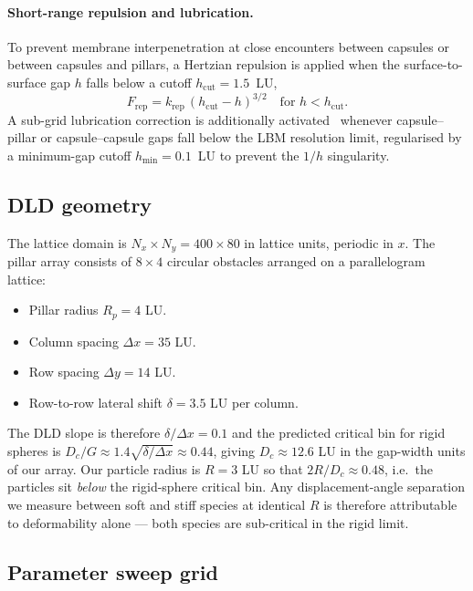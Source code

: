 \documentclass[11pt,a4paper]{article}
\begin{document}
\paragraph{Short-range repulsion and lubrication.}
To prevent membrane interpenetration at close encounters between
capsules or between capsules and pillars, a Hertzian repulsion is
applied when the surface-to-surface gap $h$ falls below a cutoff
$h_{\text{cut}} = 1.5$~LU,
\begin{equation}
F_{\text{rep}} = k_{\text{rep}} \, (h_{\text{cut}} - h)^{3/2}
\quad\text{for } h < h_{\text{cut}}.
\end{equation}
A sub-grid lubrication correction is additionally
activated~\citep{kruger2011efficient} whenever
capsule--pillar or capsule--capsule gaps fall below the LBM
resolution limit, regularised by a minimum-gap cutoff
$h_{\min} = 0.1$~LU to prevent the $1/h$ singularity.

\subsection{DLD geometry}
\label{sec:methods-geometry}

The lattice domain is $N_x \times N_y = 400 \times 80$ in lattice
units, periodic in $x$. The pillar array consists of $8 \times 4$
circular obstacles arranged on a parallelogram lattice:
\begin{itemize}
  \item Pillar radius $R_p = 4$ LU.
  \item Column spacing $\Delta x = 35$ LU.
  \item Row spacing $\Delta y = 14$ LU.
  \item Row-to-row lateral shift $\delta = 3.5$ LU per column.
\end{itemize}
The DLD slope is therefore $\delta/\Delta x = 0.1$ and the predicted
critical bin for rigid spheres
\citep{holm2011separation} is
$D_c / G \approx 1.4 \sqrt{\delta/\Delta x} \approx 0.44$,
giving $D_c \approx 12.6$ LU in the gap-width units of our array.
Our particle radius is $R = 3$ LU so that $2R/D_c \approx 0.48$,
i.e.\ the particles sit \emph{below} the rigid-sphere critical bin.
Any displacement-angle separation we measure between soft and stiff
species at identical $R$ is therefore attributable to deformability
alone --- both species are sub-critical in the rigid limit.

\subsection{Parameter sweep grid}
\label{sec:methods-sweep}
\end{document}
